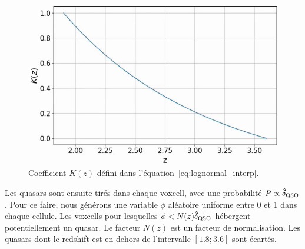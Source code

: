 \documentclass[11pt, twoside, a4paper, openright]{report}
\begin{document}
\begin{figure}
  \centering
  \label{fig:kz}
  \includegraphics[scale=0.4]{kz}
  \caption{Coefficient $K(z)$ défini dans l'équation~\ref{eq:lognormal_interp}.}
\end{figure}
Les quasars sont ensuite tirés dans chaque voxcell, avec une probabilité $P \propto \hat \delta_{\textsc{QSO}}$. Pour ce faire, nous générons une variable $\phi$ aléatoire uniforme entre 0 et 1 dans chaque cellule. Les voxcells pour lesquelles $\phi < N(z) \hat \delta_{\textsc{QSO}}$ hébergent potentiellement un quasar. Le facteur $N(z)$ est un facteur de normalisation. Les quasars dont le redshift est en dehors de l'intervalle $[\num{1.8}; \num{3.6}]$ sont écartés.
\end{document}
